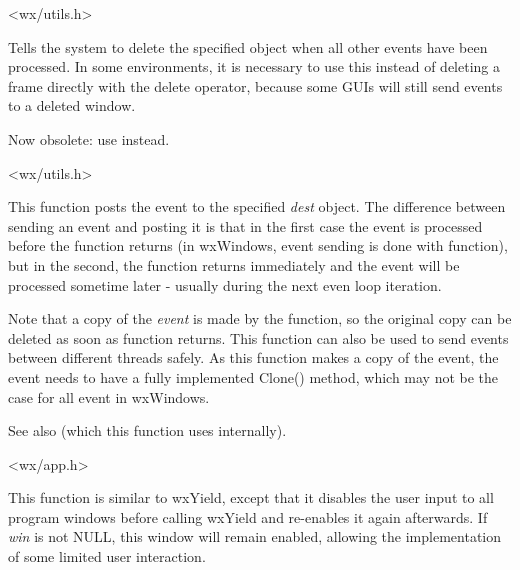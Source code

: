 
<wx/utils.h>

\label{wxpostdelete}


Tells the system to delete the specified object when
all other events have been processed. In some environments, it is
necessary to use this instead of deleting a frame directly with the
delete operator, because some GUIs will still send events to a deleted window.

Now obsolete: use  instead.


<wx/utils.h>

\label{wxpostevent}


This function posts the event to the specified {\it dest} object. The
difference between sending an event and posting it is that in the first case
the event is processed before the function returns (in wxWindows, event sending
is done with  function), but in
the second, the function returns immediately and the event will be processed
sometime later - usually during the next even loop iteration.

Note that a copy of the {\it event} is made by the function, so the original
copy can be deleted as soon as function returns. This function can also be used
to send events between different threads safely. As this function makes a
copy of the event, the event needs to have a fully implemented Clone() method,
which may not be the case for all event in wxWindows.

See also  (which this function
uses internally).


<wx/app.h>

\label{wxsafeyield}


This function is similar to wxYield, except that it disables the user input to
all program windows before calling wxYield and re-enables it again
afterwards. If {\it win} is not NULL, this window will remain enabled, 
allowing the implementation of some limited user interaction.


